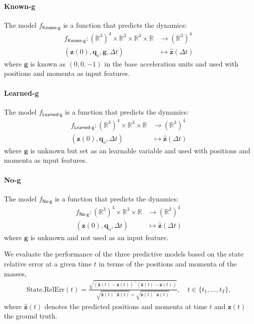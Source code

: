 \documentclass{article} %
\begin{document}
\paragraph{Known-g} The model $f_{\textsf{Known-g}}$ is a function that predicts the dynamics: 
\begin{equation}
\begin{aligned}
    f_{\textsf{Known-g}}: (\mathbb R^3)^4\times \mathbb{R}^3 \times \mathbb{R}^3 \times \mathbb R &\to (\mathbb R^{3})^4  \\
    (\mathbf{z}(0),\mathbf{q}_o,\mathbf{g},\Delta t) &\mapsto  \mathbf{\hat z}(\Delta t) 
\end{aligned}\label{eq:goal_F_know-g}
\end{equation}
where $\mathbf{g}$ is known as $(0,0,-1)$ in the base acceleration units and used with positions and momenta as input features.  

\paragraph{Learned-g} The model $f_{\textsf{Learned-g}}$ is a function that predicts the dynamics: 
\begin{equation}
\begin{aligned}
    f_{\textsf{Learned-g}}: (\mathbb R^3)^4 \times \mathbb{R}^3 \times \mathbb R &\to (\mathbb R^{3})^4  \\
    (\mathbf{z}(0),\mathbf{q}_o, \Delta t) &\mapsto  \mathbf{\hat z}(\Delta t) 
\end{aligned}\label{eq:goal_F_learn-g}
\end{equation}
where $\mathbf{g}$ is unknown but set as an learnable variable and used with positions and momenta as input features.   

\paragraph{No-g} The model $f_{\textsf{No-g}}$ is a function that predicts the dynamics: 
\begin{equation}
\begin{aligned}
    f_{\textsf{No-g}}: (\mathbb R^3)^4 \times \mathbb{R}^3 \times \mathbb R &\to (\mathbb R^{3})^4  \\
    (\mathbf{z}(0),\mathbf{q}_o, \Delta t) &\mapsto  \mathbf{\hat z}(\Delta t)
\end{aligned}\label{eq:goal_F_no-g}
\end{equation}
where $\mathbf{g}$ is unknown and not used as an input feature.

We evaluate the performance of the three predictive models based on the state relative error at a given time $t$ in terms of the positions and momenta of the masses,
\begin{align}
    \text{State.RelErr}(t) =  \frac{\sqrt{(\hat{\mathbf{z}}(t)-\mathbf{z}(t))^\top (\hat{\mathbf{z}}(t)-\mathbf{z}(t))}}{\sqrt{\hat{\mathbf z}(t)^\top\hat{\mathbf z}(t)}+\sqrt{\mathbf z(t)^\top \mathbf z(t)}}, \quad t\in\{t_1,\ldots,t_T\},\label{eq:state_relerr}
\end{align}
where $\hat{\mathbf{z}}(t)$ denotes the predicted positions and momenta at time $t$ and $\mathbf{z}(t)$ the ground truth.
\end{document}
